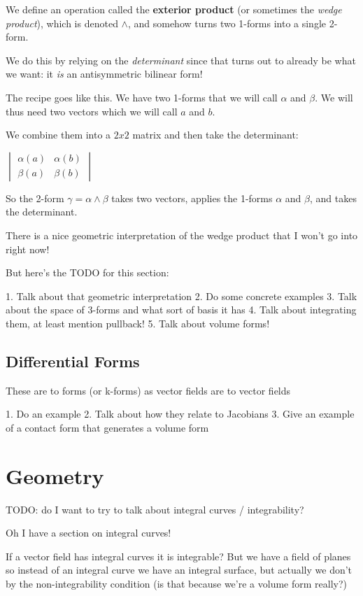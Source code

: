 \documentclass{article}
\begin{document}
We define an operation called the \textbf{exterior product} (or sometimes the
\textit{wedge product}), which is denoted $\wedge$, and somehow turns two
1-forms into a single 2-form.

We do this by relying on the \textit{determinant} since that turns out to
already be what we want: it \textit{is} an antisymmetric bilinear form!

The recipe goes like this. We have two 1-forms that we will call $\alpha$ and
$\beta$. We will thus need two vectors which we will call $a$ and $b$.

We combine them into a $2 x 2$ matrix and then take the determinant:

$
\begin{vmatrix}
  \alpha (a) & \alpha (b) \\
  \beta  (a) & \beta  (b)
\end{vmatrix}
$

So the 2-form $\gamma = \alpha \wedge \beta$ takes two vectors, applies the
1-forms $\alpha$ and $\beta$, and takes the determinant.

There is a nice geometric interpretation of the wedge product that I won't go
into right now!

But here's the TODO for this section:

1. Talk about that geometric interpretation
2. Do some concrete examples
3. Talk about the space of 3-forms and what sort of basis it has
4. Talk about integrating them, at least mention pullback!
5. Talk about volume forms!

\subsection {Differential Forms}

These are to forms (or k-forms) as vector fields are to vector fields

1. Do an example
2. Talk about how they relate to Jacobians
3. Give an example of a contact form that generates a volume form

\section {Geometry}

TODO: do I want to try to talk about integral curves / integrability?

Oh I have a section on integral curves!

If a vector field has integral curves it is integrable? But we have a field of
planes so instead of an integral curve we have an integral surface, but actually
we don't by the non-integrability condition (is that because we're a volume form
really?)
\end{document}

